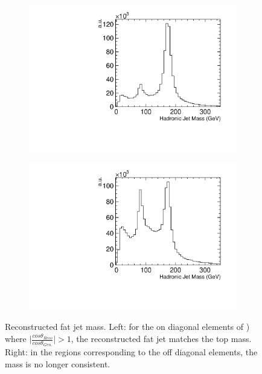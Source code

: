 \begin{figure}
  \centering
  \begin{subfigure}{.5\textwidth}
    \centering
    \includegraphics[width=1.0\textwidth]{TopAnalysis/figures/TopMassDiagonal.pdf}
  \end{subfigure}%
  \begin{subfigure}{.5\textwidth}
    \centering\captionsetup{width=.8\linewidth}%
    \includegraphics[width=1.0\textwidth]{TopAnalysis/figures/TopMassOffDiagonal.pdf}
  \end{subfigure}
  \caption[Reconstructed fat jet mass]{Reconstructed fat jet mass. Left: for the on diagonal elements of ) where $\mid\frac{cos\theta_{Reco}}{cos\theta_{Gen.}}\mid >1$, the reconstructed fat jet matches the top mass. Right: in the regions corresponding to the off diagonal elements, the mass is no longer consistent.}
  \label{fig:diagonalTopMass}
\end{figure}


